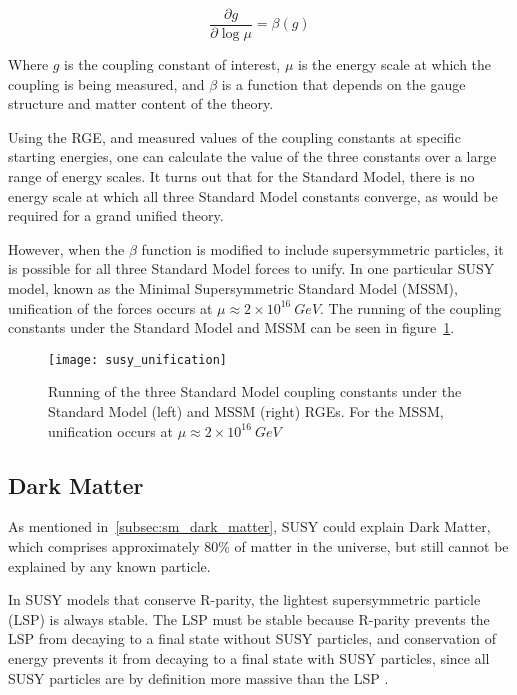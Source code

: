 \begin{equation}\label{eq:renorm_group}
    \frac{\partial g}{\partial \log \mu} = \beta(g)
\end{equation}

Where $g$ is the coupling constant of interest, $\mu$ is the energy scale at which the coupling is being measured,
and $\beta$ is a function that depends on the gauge structure and matter content of the theory.

Using the RGE, and measured values of the coupling constants at specific starting energies,
one can calculate the value of the three constants over a large range of energy scales.
It turns out that for the Standard Model, there is no energy scale at which all three Standard Model constants converge,
as would be required for a grand unified theory.

However, when the $\beta$ function is modified to include supersymmetric particles,
it is possible for all three Standard Model forces to unify.
In one particular SUSY model, known as the Minimal Supersymmetric Standard Model (MSSM),
unification of the forces occurs at $\mu \approx 2\times10^{16}~GeV$.\cite{susy-unification-1998}
The running of the coupling constants under the Standard Model and MSSM can be seen in figure~\ref{fig:susy_unification}.

\begin{figure}[!ht]
    \centering
\texttt{[image: susy\_unification]}
\caption{Running of the three Standard Model coupling constants under the Standard Model (left) and MSSM (right) RGEs.
For the MSSM, unification occurs at $\mu\approx 2\times 10^{16}~GeV$}
\label{fig:susy_unification}
\end{figure}\cite{susy-pheno-2000}

\subsection{Dark Matter}\label{subsec:susy_dark_matter}

As mentioned in~\ref{subsec:sm_dark_matter}, SUSY could explain Dark Matter,
which comprises approximately $80\%$ of matter in the universe, but still cannot be explained by any known particle.

In SUSY models that conserve R-parity, the lightest supersymmetric particle (LSP) is always stable.
The LSP must be stable because R-parity prevents the LSP from decaying to a final state without SUSY particles,
and conservation of energy prevents it from decaying to a final state with SUSY particles,
since all SUSY particles are by definition more massive than the LSP .

